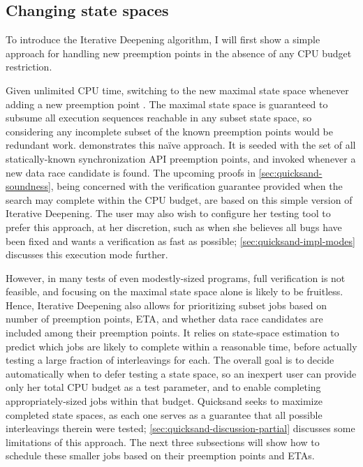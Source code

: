 
\subsection{Changing state spaces}

To introduce the Iterative Deepening algorithm,
I will first show a simple approach for handling new preemption points in the absence of any CPU budget restriction.

Given unlimited CPU time, %
switching to the new maximal state space whenever adding a new preemption point
.
The maximal state space is guaranteed to subsume all execution sequences reachable in any subset state space,
so considering any incomplete subset of the known preemption points would be redundant work.
 demonstrates this na\"ive approach.
It is seeded with the set of all statically-known synchronization API preemption points,
and invoked whenever a new data race candidate is found.
%
The upcoming proofs in \cref{sec:quicksand-soundness},
being concerned with the verification guarantee provided when the search may complete within the CPU budget,
are based on this simple version of Iterative Deepening.
The user may also wish to configure her testing tool to prefer this approach, at her discretion,
such as when she believes all bugs have been fixed and wants a verification as fast as possible;
\cref{sec:quicksand-impl-modes} discusses this execution mode further.

However, in many tests of even modestly-sized programs,
full verification is not feasible,
and focusing on the maximal state space alone is likely to be fruitless.
%
Hence, Iterative Deepening also allows for prioritizing subset jobs
based on number of preemption points, ETA, and whether data race candidates are included among their preemption points.
It relies on state-space estimation \cite{estimation}
to predict which jobs are likely to complete within a reasonable time,
before actually testing a large fraction of interleavings for each.
The overall goal is to decide automatically when to defer testing a state space,
so an inexpert user can provide only her total CPU budget as a test parameter,
and to enable completing appropriately-sized jobs within that budget.
Quicksand seeks to maximize completed state spaces,
as each one serves as a guarantee that all possible interleavings therein were tested;
\cref{sec:quicksand-discussion-partial} discusses some limitations of this approach.
The next three subsections will show how to schedule these smaller jobs
based on their preemption points and ETAs.

